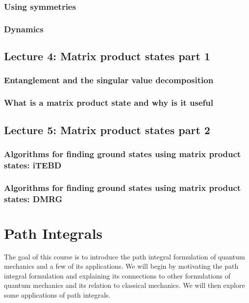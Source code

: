 \documentclass{book}
\theoremstyle{definition}
\begin{document}
\subsection{Using symmetries}
\newpage
\subsection{Dynamics}
\newpage




\section{Lecture 4: Matrix product states part 1}
\subsection{Entanglement and the singular value decomposition}
\newpage
\subsection{What is a matrix product state and why is it useful}
\newpage


\section{Lecture 5: Matrix product states part 2}
\subsection{Algorithms for finding ground states using matrix product states: iTEBD }

\newpage


\subsection{Algorithms for finding ground states using matrix product states: DMRG }

\newpage











\chapter{Path Integrals}

The goal of this course is to introduce the path integral formulation of quantum mechanics and a few of its applications. We will begin by motivating the path integral formulation and explaining its connections to other formulations of quantum mechanics and its relation to classical mechanics. We will then explore some applications of path integrals.
\end{document}
